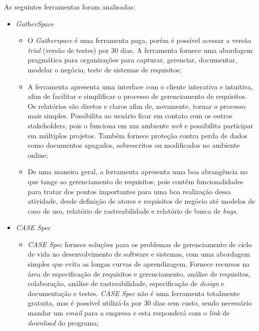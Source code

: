 
 As seguintes ferramentas foram analisadas:
 
 
  \begin{itemize}
   \item \textit{GatherSpace \footnotemark}
      
      \begin{itemize}
       \item
	  
	  O \textit{Gatherspace} é uma ferramenta paga, porém é possível acessar a versão \textit{trial} (versão de testes) por 30 dias.
	  A ferramenta fornece uma abordagem pragmática para organizações para capturar, gerenciar, documentar, modelar
	  o negócio, teste de sistemas de requisitos;
		  
       \item
	  
	  A ferramenta apresenta uma interface com o cliente interativa e intuitiva, afim de facilitar e simplificar o processo
	  de gerenciamento de requisitos. Os relatórios são diretos e claros afim de, novamente, tornar o processo mais simples.
	  Possibilita ao usuário ficar em contato com os outros stakeholders, pois o funciona em um ambiente \textit{web} e
	  possibilita participar em múltiplos projetos. Também fornece proteção contra perda de dados como documentos apagados,
	  sobrescritos ou modificados no ambiente online;
	  
       \item
	
	  De uma maneira geral, a ferramenta apresenta uma boa abrangência no que tange ao gerenciamento de requisitos, pois
	  contém funcionalidades para tratar dos pontos importantes para uma boa realização dessa atividade, desde definição
	  de atores e requisitos de negócio até modelos de caso de uso, relatório de rastreabilidade e relatório de busca
	  de \textit{bugs}.

      \end{itemize}

   \item \textit{CASE Spec \footnotemark}
      
      \begin{itemize}
       \item 
	  
	  \textit{CASE Spec} fornece soluções para os problemas de gerenciamento de ciclo de vida no desenvolvimento de software e
	  sistemas, com uma abordagem simples que evita as longas curvas de aprendizagem. Fornece recursos na área de
	  especificação de requisitos e gerenciamento, análise de requisitos, colaboração, análise de rastreabilidade,
	  especificação de \textit{design} e documentação e testes. \textit{CASE Spec} não é uma ferramenta totalmente gratuita, mas é possível
	  utilizá-la por 30 dias sem custo, sendo necessário mandar um \textit{email} para a empresa e esta responderá com o
	  \textit{link} de \textit{download} do programa;
	  

\end{itemize}
\end{itemize}
